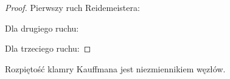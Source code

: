 \begin{proof}
    Pierwszy ruch Reidemeistera:

\noindent
Dla drugiego ruchu:

\noindent
Dla trzeciego ruchu:

\end{proof}

\begin{corollary}
    Rozpiętość klamry Kauffmana jest niezmiennikiem węzłów.
\end{corollary}

